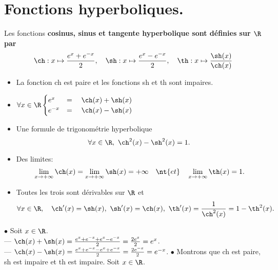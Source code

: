 \documentclass[11pt]{article}
\begin{document}
\section{Fonctions hyperboliques.}

\begin{defi}{}{}
    Les fonctions \bf{cosinus, sinus et tangente hyperbolique} sont définies sur $\R$ par
    \begin{equation*}
        \ch : x\mapsto\frac{e^x+e^{-x}}{2},\quad\sh:x\mapsto\frac{e^x-e^{-x}}{2},\quad\th:x\mapsto\frac{\sh(x)}{\ch(x)}
    \end{equation*}
\end{defi}

\pagebreak

\begin{prop}{}{}
    \begin{itemize}
        \item La fonction ch est paire et les fonctions sh et th sont impaires.
        \item $\forall x \in \R \begin{cases}
            e^x&=\quad\ch(x)+\sh(x)\\
            e^{-x}&=\quad\ch(x)-\sh(x)
        \end{cases}$
        \item Une formule de trigonométrie hyperbolique
        \begin{equation*}
            \forall x \in \R,~\ch^2(x)-\sh^2(x)=1.
        \end{equation*}
        \item Des limites:
        \begin{equation*}
            \lim_{x\to+\infty}\ch(x)=\lim_{x\to+\infty}\sh(x)=+\infty\quad\nt{et}\quad\lim_{x\to+\infty}\th(x)=1.
        \end{equation*}
        \item Toutes les trois sont dérivables sur $\R$ et
        \begin{equation*}
            \forall x \in \R, \quad \ch'(x)=\sh(x),~\sh'(x)=\ch(x),~\th'(x)=\frac{1}{\ch^2(x)}=1-\th^2(x).
        \end{equation*}
    \end{itemize}
    \tcblower
    $\bullet$ Soit $x\in\R$.\\
    --- $\ch(x)+\sh(x)=\frac{e^x+e^{-x}+e^{x}-e^{-x}}{2}=\frac{2e^x}{2}=e^x$.\\
    --- $\ch(x)-\sh(x)=\frac{e^x+e^{-x}-e^x+e^{-x}}{2}=\frac{2e^{-x}}{2}=e^{-x}$.\n
    $\bullet$ Montrons que ch est paire, sh est impaire et th est impaire. Soit $x\in\R$.\\

\end{prop}
\end{document}
